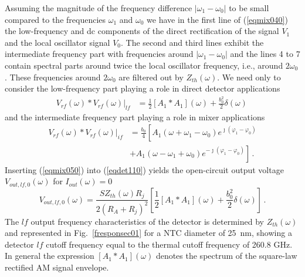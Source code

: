 \documentclass[journal]{IEEEtran}
\begin{document}
%
Assuming the magnitude of the frequency difference $|\omega_1- \omega_0|$ to be small compared to the frequencies $\omega_1$ and $\omega_0$ we have in the first line of (\ref{eqmix040}) the low-frequency and dc components of the direct rectification of the signal $V_1$ and the local oscillator signal $V_0$. The second and third lines exhibit the intermediate frequency part with frequencies around $|\omega_1- \omega_0|$ and the lines 4 to 7 contain spectral parts around twice the local oscillator frequency, i.e., around $2\omega_0$. These frequencies around $2\omega_0$ are filtered out by $Z_{th}(\omega)$. We need only to consider the low-frequency part playing a role in direct detector applications
%
\begin{align}	\label{eqmix050}  
	\left. V_{rf}(\omega) \ast V_{rf}(\omega) \right|_{lf} & =  \frac{1}{2} \left[A_1\ast A_1\right](\omega)  +\frac{b_0^2}{2} \delta(\omega) 	                \,  
\end{align}
%
and the intermediate frequency part playing a role in mixer applications
%
\begin{align}	\label{eqmix060}
	\left. V_{rf}(\omega) \ast V_{rf}(\omega) \right|_{if}& = \frac{b_0}{4}\left[ A_1(\omega + \omega_1 -\omega_0 )e^{\jmath (\varphi_1-\varphi_0)} \right. \\
	& +  \left. A_1(\omega - \omega_1 +\omega_0 )e^{-\jmath (\varphi_1-\varphi_0)} \right] 
	\, . \nonumber
\end{align}
%
Inserting (\ref{eqmix050}) into (\ref{eqdet110}) yields the open-circuit output voltage $V_{out,lf,0}(\omega)$ for $I_{out} (\omega)=0$
%
\begin{equation}	\label{eqmix070}
	V_{out,lf,0}(\omega) =  \frac{S  Z_{th}(\omega) R_j}{2(R_A+R_j )^2} 
	 \left[ \frac{1}{2} \left[A_1\ast A_1\right](\omega)  +\frac{b_0^2}{2} \delta(\omega) \right]	 \, .
\end{equation}
%
The $lf$ output frequency characteristics of the detector is determined by $Z_{th}(\omega)$ and represented in Fig.~\ref{fresponsec01} for a NTC diameter of 25~nm, showing a detector $lf$ cutoff frequency equal to the thermal cutoff frequency  of 260.8 GHz. In general the expression $\left[A_1\ast A_1\right](\omega)$ denotes the spectrum of the square-law rectified AM signal envelope.
\end{document}
